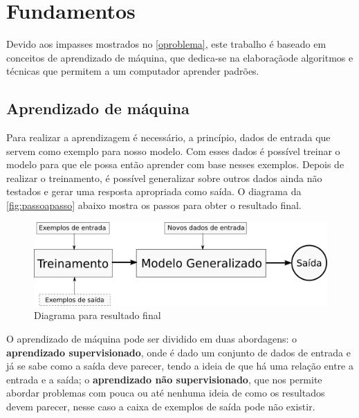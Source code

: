 \chapter{Fundamentos}\label{fundamentos}

Devido aos impasses mostrados no \autoref{oproblema}, este trabalho é baseado em conceitos de aprendizado de máquina, que dedica-se na elaboraçãode algoritmos e técnicas que permitem a um computador aprender padrões.  

\section{Aprendizado de máquina}\label{sec:aprendizadodemaquina}

Para realizar a aprendizagem é necessário, a princípio, dados de entrada que servem como exemplo para nosso modelo. Com esses dados é possível treinar o modelo para que ele possa então aprender com base nesses exemplos. Depois de realizar o treinamento, é possível generalizar sobre outros dados ainda não testados e gerar uma resposta apropriada como saída. O diagrama da \autoref{fig:passoapasso} abaixo mostra os passos para obter o resultado final.

\begin{figure}[htb]
	  \caption{Diagrama para resultado final}\label{fig:passoapasso}
	  \begin{center}
	      \includegraphics[scale=0.5]{img/passoapasso}
	  \end{center}
\end{figure}


O aprendizado de máquina pode ser dividido em duas abordagens: o \textbf{aprendizado supervisionado}, onde é dado um conjunto de dados de entrada e já se sabe como a saída deve parecer, tendo a ideia de que há uma relação entre a entrada e a saída; o \textbf{aprendizado não supervisionado}, que nos permite abordar problemas com pouca ou até nenhuma ideia de como os resultados devem parecer, nesse caso a caixa de exemplos de saída pode não existir.


